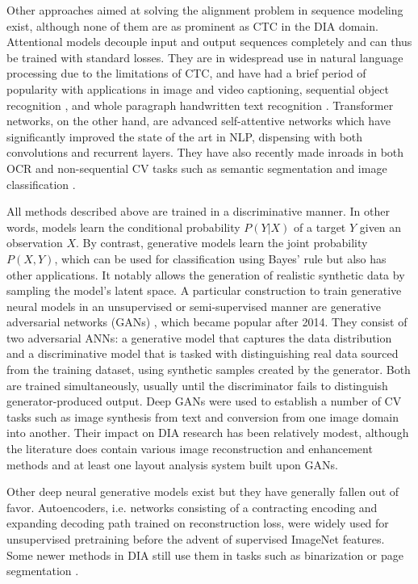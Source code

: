 Other approaches aimed at solving the alignment problem in sequence modeling
exist, although none of them are as prominent as CTC in the DIA domain.
Attentional models decouple input and output sequences completely and can thus
be trained with standard losses. They are in widespread use in natural language
processing due to the limitations of CTC, and  have had a brief period of
popularity with applications in image \cite{xu2015show} and video
\cite{song2017hierarchical} captioning, sequential object recognition
\cite{ba2014multiple}, and whole paragraph handwritten text recognition
\cite{8270105, bluche2016joint}. Transformer networks, on the other hand, are
advanced self-attentive networks which have significantly improved the state of
the art in NLP, dispensing with both convolutions and recurrent layers. They
have also recently made inroads in both OCR \cite{transcribr} and
non-sequential CV tasks such as semantic segmentation and image classification
\cite{wu2020visual}.

All methods described above are trained in a discriminative manner. In other
words, models learn the conditional probability $P(Y|X)$ of a target $Y$ given
an observation $X$. By contrast, generative models learn the joint probability
$P(X, Y)$, which can be used for classification using Bayes' rule but also has
other applications. It notably allows the generation of realistic synthetic
data by sampling the model's latent space. A particular construction to train
generative neural models in an unsupervised or semi-supervised manner are
generative adversarial networks (GANs) \cite{goodfellow2014generative}, which
became popular after 2014. They consist of two adversarial ANNs: a generative
model that captures the data distribution and a discriminative model that is
tasked with distinguishing real data sourced from the training dataset, using
synthetic samples created by the generator. Both are trained simultaneously,
usually until the discriminator fails to distinguish generator-produced output.
Deep GANs were used to establish a number of CV tasks such as image synthesis
from text \cite{reed2016generative} and conversion from one image domain into
another\cite{CycleGAN2017}. Their impact on DIA research has been relatively
modest, although the literature does contain various image reconstruction and
enhancement methods \cite{nguyen2019character,suh2020two} and at least one
layout analysis system \cite{quiros2018multi} built upon GANs.

Other deep neural generative models exist but they have generally fallen out of
favor. Autoencoders, i.e. networks consisting of a contracting encoding and
expanding decoding path trained on reconstruction loss, were widely used for
unsupervised pretraining\cite{vincent2008extracting,erhan2010does} before the
advent of supervised ImageNet features. Some newer methods in DIA still use
them in tasks such as binarization \cite{calvo2019selectional} or page
segmentation \cite{chen2015page,wei2015selecting}.


